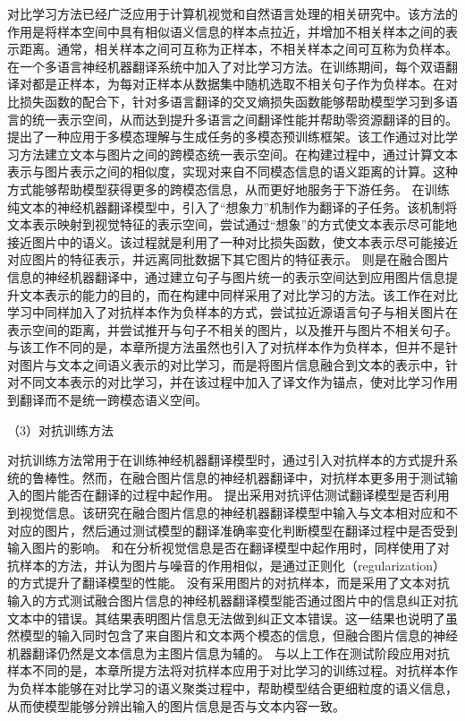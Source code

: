 对比学习方法已经广泛应用于计算机视觉和自然语言处理的相关研究中。该方法的作用是将样本空间中具有相似语义信息的样本点拉近，并增加不相关样本之间的表示距离。通常，相关样本之间可互称为正样本，不相关样本之间可互称为负样本。
在一个多语言神经机器翻译系统中加入了对比学习方法。在训练期间，每个双语翻译对都是正样本，为每对正样本从数据集中随机选取不相关句子作为负样本。在对比损失函数的配合下，针对多语言翻译的交叉熵损失函数能够帮助模型学习到多语言的统一表示空间，从而达到提升多语言之间翻译性能并帮助零资源翻译的目的。
提出了一种应用于多模态理解与生成任务的多模态预训练框架。该工作通过对比学习方法建立文本与图片之间的跨模态统一表示空间。在构建过程中，通过计算文本表示与图片表示之间的相似度，实现对来自不同模态信息的语义距离的计算。这种方式能够帮助模型获得更多的跨模态信息，从而更好地服务于下游任务。
在训练纯文本的神经机器翻译模型中，引入了“想象力”机制作为翻译的子任务。该机制将文本表示映射到视觉特征的表示空间，尝试通过“想象”的方式使文本表示尽可能地接近图片中的语义。该过程就是利用了一种对比损失函数，使文本表示尽可能接近对应图片的特征表示，并远离同批数据下其它图片的特征表示。
则是在融合图片信息的神经机器翻译中，通过建立句子与图片统一的表示空间达到应用图片信息提升文本表示的能力的目的，而在构建中同样采用了对比学习的方法。该工作在对比学习中同样加入了对抗样本作为负样本的方式，尝试拉近源语言句子与相关图片在表示空间的距离，并尝试推开与句子不相关的图片，以及推开与图片不相关句子。与该工作不同的是，本章所提方法虽然也引入了对抗样本作为负样本，但并不是针对图片与文本之间语义表示的对比学习，而是将图片信息融合到文本的表示中，针对不同文本表示的对比学习，并在该过程中加入了译文作为锚点，使对比学习作用到翻译而不是统一跨模态语义空间。

{\sffamily （3）对抗训练方法}

对抗训练方法常用于在训练神经机器翻译模型时，通过引入对抗样本的方式提升系统的鲁棒性。然而，在融合图片信息的神经机器翻译中，对抗样本更多用于测试输入的图片能否在翻译的过程中起作用。
提出采用对抗评估测试翻译模型是否利用到视觉信息。该研究在融合图片信息的神经机器翻译模型中输入与文本相对应和不对应的图片，然后通过测试模型的翻译准确率变化判断模型在翻译过程中是否受到输入图片的影响。
和在分析视觉信息是否在翻译模型中起作用时，同样使用了对抗样本的方法，并认为图片与噪音的作用相似，是通过正则化（regularization）的方式提升了翻译模型的性能。
没有采用图片的对抗样本，而是采用了文本对抗输入的方式测试融合图片信息的神经机器翻译模型能否通过图片中的信息纠正对抗文本中的错误。其结果表明图片信息无法做到纠正文本错误。这一结果也说明了虽然模型的输入同时包含了来自图片和文本两个模态的信息，但融合图片信息的神经机器翻译仍然是文本信息为主图片信息为辅的。
与以上工作在测试阶段应用对抗样本不同的是，本章所提方法将对抗样本应用于对比学习的训练过程。对抗样本作为负样本能够在对比学习的语义聚类过程中，帮助模型结合更细粒度的语义信息，从而使模型能够分辨出输入的图片信息是否与文本内容一致。